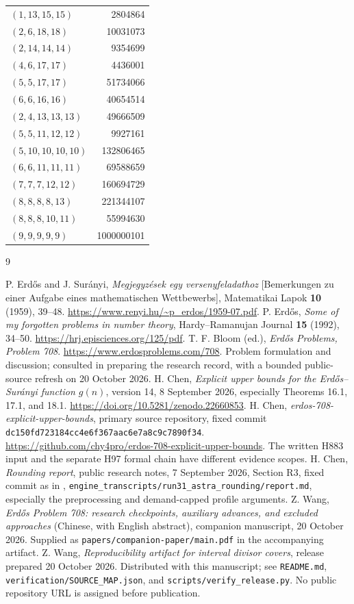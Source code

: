 \documentclass[11pt,a4paper]{article}
\begin{document}
\begin{longtable}{@{}lr@{}}
$(1,13,15,15)$ & 2804864\\
$(2,6,18,18)$ & 10031073\\
$(2,14,14,14)$ & 9354699\\
$(4,6,17,17)$ & 4436001\\
$(5,5,17,17)$ & 51734066\\
$(6,6,16,16)$ & 40654514\\
$(2,4,13,13,13)$ & 49666509\\
$(5,5,11,12,12)$ & 9927161\\
$(5,10,10,10,10)$ & 132806465\\
$(6,6,11,11,11)$ & 69588659\\
$(7,7,7,12,12)$ & 160694729\\
$(8,8,8,8,13)$ & 221344107\\
$(8,8,8,10,11)$ & 55994630\\
$(9,9,9,9,9)$ & 1000000101\\
\bottomrule\end{longtable}
\begin{thebibliography}{9}\raggedright
{} P. Erd\H{o}s and J. Sur\'anyi, \emph{Megjegyz\'esek egy versenyfeladathoz} [Bemerkungen zu einer Aufgabe eines mathematischen Wettbewerbs], Matematikai Lapok \textbf{10} (1959), 39--48. \url{https://www.renyi.hu/~p_erdos/1959-07.pdf}.
 P. Erd\H{o}s, \emph{Some of my forgotten problems in number theory}, Hardy--Ramanujan Journal \textbf{15} (1992), 34--50. \url{https://hrj.episciences.org/125/pdf}.
 T. F. Bloom (ed.), \emph{Erd\H{o}s Problems, Problem 708}. \url{https://www.erdosproblems.com/708}. Problem formulation and discussion; consulted in preparing the research record, with a bounded public-source refresh on 20 October 2026.
 H. Chen, \emph{Explicit upper bounds for the Erd\H{o}s--Sur\'anyi function $g(n)$}, version 14, 8 September 2026, especially Theorems 16.1, 17.1, and 18.1. \url{https://doi.org/10.5281/zenodo.22660853}.
 H. Chen, \emph{erdos-708-explicit-upper-bounds}, primary source repository, fixed commit \texttt{dc150fd723184cc4e6f367aac6e7a8c9c7890f34}. \url{https://github.com/chy4pro/erdos-708-explicit-upper-bounds}. The written H883 input and the separate H97 formal chain have different evidence scopes.
 H. Chen, \emph{Rounding report}, public research notes, 7 September 2026, Section R3, fixed commit as in \cite{ChenRepo}, \nolinkurl{engine_transcripts/run31_astra_rounding/report.md}, especially the preprocessing and demand-capped profile arguments.
 Z. Wang, \emph{Erd\H{o}s Problem 708: research checkpoints, auxiliary advances, and excluded approaches} (Chinese, with English abstract), companion manuscript, 20 October 2026. Supplied as \nolinkurl{papers/companion-paper/main.pdf} in the accompanying artifact.
 Z. Wang, \emph{Reproducibility artifact for interval divisor covers}, release prepared 20 October 2026. Distributed with this manuscript; see \nolinkurl{README.md}, \nolinkurl{verification/SOURCE_MAP.json}, and \nolinkurl{scripts/verify_release.py}. No public repository URL is assigned before publication.
\end{thebibliography}
\end{document}
